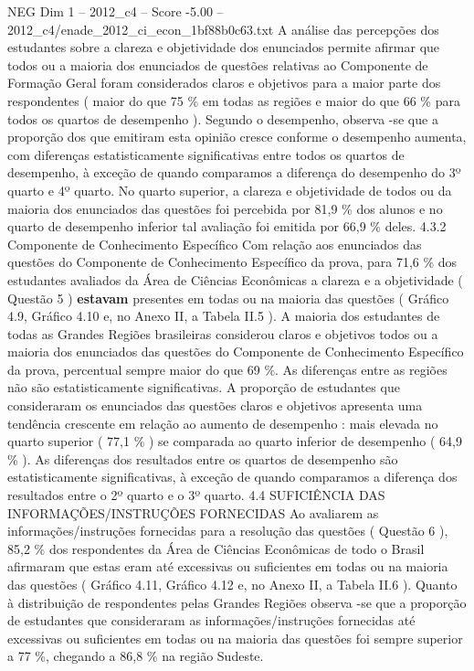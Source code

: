 \begin{textsample}{NEG Dim 1 – 2012\_c4 – Score -5.00 – 2012\_c4/enade\_2012\_ci\_econ\_1bf88b0c63.txt}
A análise das percepções dos estudantes sobre a clareza e objetividade dos enunciados permite afirmar que todos ou a maioria dos enunciados de questões relativas ao Componente de Formação Geral foram considerados claros e objetivos para a maior parte dos respondentes ( maior do que 75 \% em todas as regiões e maior do que 66 \% para todos os quartos de desempenho ).
Segundo o desempenho, observa -se que a proporção dos que emitiram esta opinião cresce conforme o desempenho aumenta, com diferenças estatisticamente significativas entre todos os quartos de desempenho, à exceção de quando comparamos a diferença do desempenho do 3º quarto e 4º quarto.
No quarto superior, a clareza e objetividade de todos ou da maioria dos enunciados das questões foi percebida por 81,9 \% dos alunos e no quarto de desempenho inferior tal avaliação foi emitida por 66,9 \% deles. 4.3.2 Componente de Conhecimento Específico Com relação aos enunciados das questões do Componente de Conhecimento Específico da prova, para 71,6 \% dos estudantes avaliados da Área de Ciências Econômicas a clareza e a objetividade ( Questão 5 ) \textbf{estavam} presentes em todas ou na maioria das questões ( Gráfico 4.9, Gráfico 4.10 e, no Anexo II, a Tabela II.5 ).
A maioria dos estudantes de todas as Grandes Regiões brasileiras considerou claros e objetivos todos ou a maioria dos enunciados das questões do Componente de Conhecimento Específico da prova, percentual sempre maior do que 69 \%.
As diferenças entre as regiões não são estatisticamente significativas.
A proporção de estudantes que consideraram os enunciados das questões claros e objetivos apresenta uma tendência crescente em relação ao aumento de desempenho : mais elevada no quarto superior ( 77,1 \% ) se comparada ao quarto inferior de desempenho ( 64,9 \% ).
As diferenças dos resultados entre os quartos de desempenho são estatisticamente significativas, à exceção de quando comparamos a diferença dos resultados entre o 2º quarto e o 3º quarto. 4.4 SUFICIÊNCIA DAS INFORMAÇÕES/INSTRUÇÕES FORNECIDAS Ao avaliarem as informações/instruções fornecidas para a resolução das questões ( Questão 6 ), 85,2 \% dos respondentes da Área de Ciências Econômicas de todo o Brasil afirmaram que estas eram até excessivas ou suficientes em todas ou na maioria das questões ( Gráfico 4.11, Gráfico 4.12 e, no Anexo II, a Tabela II.6 ).
Quanto à distribuição de respondentes pelas Grandes Regiões observa -se que a proporção de estudantes que consideraram as informações/instruções fornecidas até excessivas ou suficientes em todas ou na maioria das questões foi sempre superior a 77 \%, chegando a 86,8 \% na região Sudeste.

\end{textsample}
